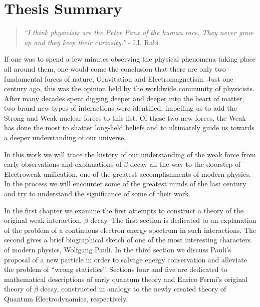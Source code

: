 \documentclass[12pt]{book}
\begin{document}

\chapter*{Thesis Summary}



\begin{quotation}
 \textit{“I think physicists are the Peter Pans of the human race. They never grow up and they keep their curiosity.”} - I.I. Rabi
\end{quotation}

If one was to spend a few minutes observing the physical phenomena taking place all around them, one would come the conclusion that there are only two fundamental forces of nature, Gravitation and Electromagnetism. Just one century ago, this was the opinion held by the worldwide community of physicists. After many decades spent digging deeper and deeper into the heart of matter, two brand new types of interactions were identified, impelling us to add the Strong and Weak nuclear forces to this list. Of these two new forces, the Weak has done the most to shatter long-held beliefs and to ultimately guide us towards a deeper understanding of our universe. 

In this work we will trace the history of our understanding of the weak force from early observations and explanations of $\beta$ decay all the way to the doorstep of Electroweak unification, one of the greatest accomplishments of modern physics. In the process we will encounter some of the greatest minds of the last century and try to understand the significance of some of their work.

In the first chapter we examine the first attempts to construct a theory of the original weak interaction, $\beta$ decay. The first section is dedicated to an explanation of the problem of a continuous electron energy spectrum in such interactions. The second gives a brief biographical sketch of one of the most interesting characters of modern physics, Wolfgang Pauli. In the third section we discuss Pauli's proposal of a new particle in order to salvage energy conservation and alleviate the problem of ``wrong statistics''. Sections four and five are dedicated to mathematical descriptions of early quantum theory and Enrico Fermi's original theory of $\beta$ decay, constructed in analogy to the newly created theory of Quantum Electrodynamics, respectively.
\end{document}
